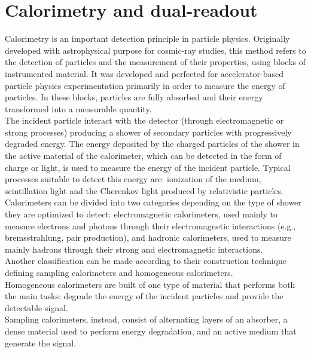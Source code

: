 \chapter{Calorimetry and dual-readout}
Calorimetry is an important detection principle in particle physics.
Originally developed with astrophysical purpose for cosmic-ray studies, this method refers to the detection of particles and the measurement of their properties, using blocks of instrumented material.
It was developed and perfected for accelerator-based particle physics experimentation primarily in order to measure the energy of particles. 
In these blocks, particles are fully absorbed and their energy transformed into a measurable quantity.\\
The incident particle interact with the detector (through electromagnetic or strong processes) producing a shower of secondary particles with progressively degraded energy.
The energy deposited by the charged particles of the shower in the active material of the calorimeter, which can be detected in the form of charge or light, is used to measure the energy of the incident particle.
Typical processes suitable to detect this energy are: ionization of the medium, scintillation light and the Cherenkov light produced by relativistic particles.\\

Calorimeters can be divided into two categories depending on the type of shower they are optimized to detect: electromagnetic calorimeters, used mainly to measure electrons and photons through their electromagnetic interactions (e.g., bremsstrahlung, pair production), and hadronic calorimeters, used to measure mainly hadrons through their strong and electromagnetic interactions.\\
Another classification can be made according to their construction technique defining sampling calorimeters and homogeneous calorimeters.\\
Homogeneous calorimeters are built of one type of material that performs both the main tasks: degrade the energy of the incident particles and provide the detectable signal.\\
Sampling calorimeters, instead, consist of alternating layers of an absorber, a dense material used to perform energy degradation, and an active medium that generate the signal.\\

